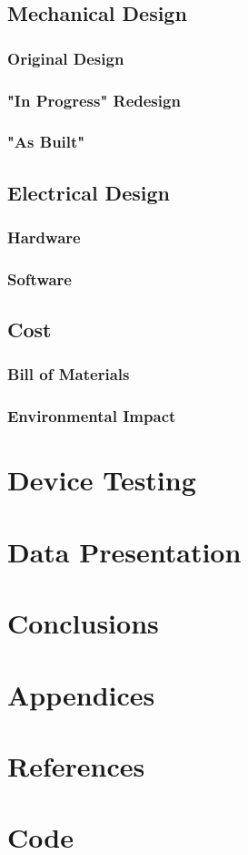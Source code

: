 \documentclass{article}
\begin{document}
\subsection{Mechanical Design}
\subsubsection{Original Design}
\subsubsection{"In Progress" Redesign}
\subsubsection{"As Built"}

\subsection{Electrical Design}
\subsubsection{Hardware}
\subsubsection{Software}

\subsection{Cost}
\subsubsection{Bill of Materials}
\subsubsection{Environmental Impact}

\newpage
\section{Device Testing}

\newpage
\section{Data Presentation}

\newpage
\section{Conclusions}

\newpage
\appendix
\section*{Appendices}
\section{References}
\section{Code}
\end{document}
